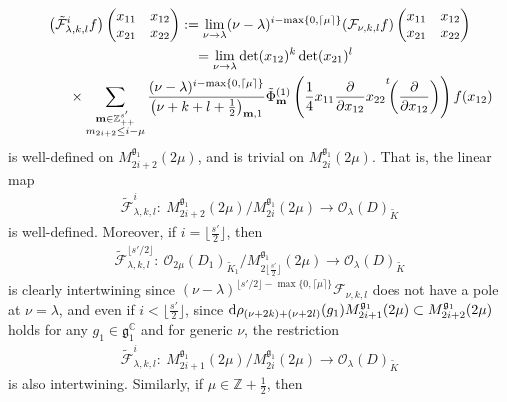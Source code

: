 \documentclass[pdftex]{sigma}
\numberwithin{equation}{section}
\newcommand{\bm}{\mathbf{m}}
\newcommand{\BZ}{\mathbb{Z}}
\newcommand{\BC}{\mathbb{C}}
\newcommand{\fg}{\mathfrak{g}}
\newcommand{\cF}{\mathcal{F}}
\newcommand{\cO}{\mathcal{O}}
\begin{document}
\begin{gather*}
\big(\tilde{\cF}^i_{\lambda,k,l}f\big)\begin{pmatrix}x_{11}&x_{12}\\x_{21}&x_{22}\end{pmatrix}
:=\lim_{\nu\to\lambda}(\nu-\lambda)^{i-\max\{0,\lceil \mu\rceil\}}(\cF_{\nu,k,l}f)\begin{pmatrix}x_{11}&x_{12}\\x_{21}&x_{22}\end{pmatrix}\\
\qquad{}=\lim_{\nu\to\lambda}\det(x_{12})^k\det(x_{21})^l \\
\qquad\quad{}\times \sum_{\substack{\bm\in\BZ_{++}^{s'}\\ m_{2i+2}\le i-\mu}}\frac{(\nu-\lambda)^{i-\max\{0,\lceil \mu\rceil\}}}{\big(\nu+k+l+\frac{1}{2}\big)_{\bm,1}}
\tilde{\Phi}_\bm^{(1)}\left(\frac{1}{4}x_{11}\frac{\partial}{\partial x_{12}}x_{22}{\vphantom{\biggl(}}^t\!\!\left(\frac{\partial}{\partial x_{12}}\right)\right)f(x_{12})
\end{gather*}
is well-defined on $M_{2i+2}^{\fg_1}(2\mu)$, and is trivial on $M_{2i}^{\fg_1}(2\mu)$. That is, the linear map
\begin{gather*} \tilde{\cF}^i_{\lambda,k,l}\colon \ M_{2i+2}^{\fg_1}(2\mu)/ M_{2i}^{\fg_1}(2\mu)\longrightarrow \cO_\lambda(D)_{\tilde{K}} \end{gather*}
is well-defined. Moreover, if $i=\big\lfloor \frac{s'}{2}\big\rfloor$, then
\begin{gather*} \tilde{\cF}^{\lfloor s'/2\rfloor}_{\lambda,k,l}\colon \ \cO_{2\mu}(D_1)_{\tilde{K}_1}
/M_{2\lfloor \frac{s'}{2}\rfloor}^{\fg_1}(2\mu)\longrightarrow \cO_\lambda(D)_{\tilde{K}} \end{gather*}
is clearly intertwining since $(\nu-\lambda)^{\lfloor s'/2\rfloor-\max\{0,\lceil \mu\rceil\}}\cF_{\nu,k,l}$ does not have a pole at $\nu=\lambda$, and even if $i<\big\lfloor \frac{s'}{2}\big\rfloor$,
since ${\rm d}\rho_{(\nu+2k)+(\nu+2l)}(g_1)M_{2i+1}^{\fg_1}(2\mu)\subset M_{2i+2}^{\fg_1}(2\mu)$ holds for any $g_1\in\fg_1^\BC$ and for generic $\nu$, the restriction
\begin{gather*} \tilde{\cF}^i_{\lambda,k,l}\colon \ M_{2i+1}^{\fg_1}(2\mu)/ M_{2i}^{\fg_1}(2\mu)\longrightarrow \cO_\lambda(D)_{\tilde{K}} \end{gather*}
is also intertwining. Similarly, if $\mu\in\BZ+\frac{1}{2}$, then
\end{document}
